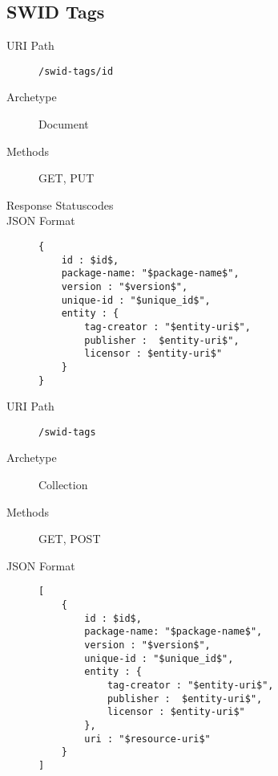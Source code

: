 \documentclass[10pt,a4paper]{scrartcl}
\begin{document}
\pagebreak
\subsection{SWID Tags}

\begin{mdframed}[style=def]
\begin{description}
	\item[URI Path] \texttt{/swid-tags/{id}}
	\item[Archetype] Document
	\item[Methods] GET, PUT
	\item[Response Statuscodes] \hfill
	\item[JSON Format] \hfill
\begin{lstlisting}
{
    id : $id$,
    package-name: "$package-name$",
    version : "$version$",
    unique-id : "$unique_id$",
    entity : {
        tag-creator : "$entity-uri$",
        publisher :  $entity-uri$",
        licensor : $entity-uri$"
    }
}
\end{lstlisting}
\end{description}
\end{mdframed}

\begin{mdframed}[style=def]
\begin{description}
	\item[URI Path] \texttt{/swid-tags}
	\item[Archetype] Collection
	\item[Methods] GET, POST
	\item[JSON Format] \hfill
\begin{lstlisting}
[
    {
        id : $id$,
        package-name: "$package-name$",
        version : "$version$",
        unique-id : "$unique_id$",
        entity : {
            tag-creator : "$entity-uri$",
            publisher :  $entity-uri$",
            licensor : $entity-uri$"
        },
        uri : "$resource-uri$"
    }
]
\end{lstlisting}
\end{description}
\end{mdframed}
\end{document}
